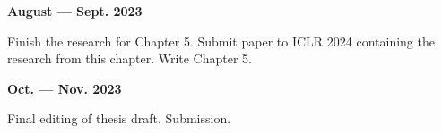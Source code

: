 \documentclass[a4paper]{article}
\begin{document}
\vspace{1em}

\noindent\begin{minipage}[t]{0.33\textwidth}
    \textbf{August --- Sept. 2023}
\end{minipage}
\hfill
\begin{minipage}[t]{0.66\textwidth}
    Finish the research for Chapter 5. Submit paper to ICLR 2024 containing the research from this chapter. Write Chapter 5.
\end{minipage}

\vspace{1em}

\noindent\begin{minipage}[t]{0.33\textwidth}
    \textbf{Oct. --- Nov. 2023}
\end{minipage}
\hfill
\begin{minipage}[t]{0.66\textwidth}
    Final editing of thesis draft. Submission.
\end{minipage}







\end{document}
